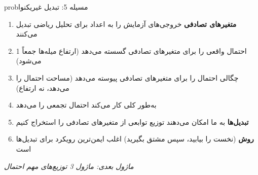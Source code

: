 \begin{PSbox}[unbreakable]{prob}{مسیله 5: تبدیل غیریکنوا}
\begin{Shaded}
\begin{Highlighting}[]
 \OperatorTok{=} \OperatorTok{;}
 \OperatorTok{=} \OperatorTok{*}\NormalTok{(}\OperatorTok{,}\NormalTok{) }\OperatorTok{{-}} \OperatorTok{;}   
 \OperatorTok{=} \OperatorTok{;}
\NormalTok{(}\OperatorTok{,} \OperatorTok{,} \OperatorTok{,} \NormalTok{)}\OperatorTok{;}
 \OperatorTok{;}
 \OperatorTok{=} \NormalTok{(}\OperatorTok{,} \OperatorTok{,} \NormalTok{)}\OperatorTok{;}
\NormalTok{(}\OperatorTok{,} \NormalTok{(}\OperatorTok{*}\NormalTok{(}\NormalTok{))}\OperatorTok{,} \OperatorTok{,} \OperatorTok{,} \NormalTok{)}\OperatorTok{;}
\NormalTok{(}\OperatorTok{,} \NormalTok{)}\OperatorTok{;}
\NormalTok{(}\NormalTok{)}\OperatorTok{;} \NormalTok{(}\NormalTok{)}\OperatorTok{;}
\end{Highlighting}
\end{Shaded}

\end{PSbox}


\begin{enumerate}
\def\labelenumi{\arabic{enumi}.}
\tightlist
\item
  \textbf{متغیرهای تصادفی} خروجی‌های آزمایش را به اعداد برای تحلیل ریاضی تبدیل می‌کنند
\item
   احتمال واقعی را برای متغیرهای تصادفی گسسته می‌دهد (ارتفاع میله‌ها جمعاً 1 می‌شود)
\item
   چگالی احتمال را برای متغیرهای تصادفی پیوسته می‌دهد (مساحت احتمال را می‌دهد، نه ارتفاع)
\item
   به‌طور کلی کار می‌کند  احتمال تجمعی  را می‌دهد
\item
  \textbf{تبدیل‌ها} به ما امکان می‌دهند توزیع توابعی از متغیرهای تصادفی را استخراج کنیم
\item
  \textbf{روش } (نخست  را بیابید، سپس مشتق بگیرید) اغلب ایمن‌ترین رویکرد برای تبدیل‌ها است
\end{enumerate}

\emph{ماژول بعدی: {ماژول 3  توزیع‌های مهم احتمال}}
